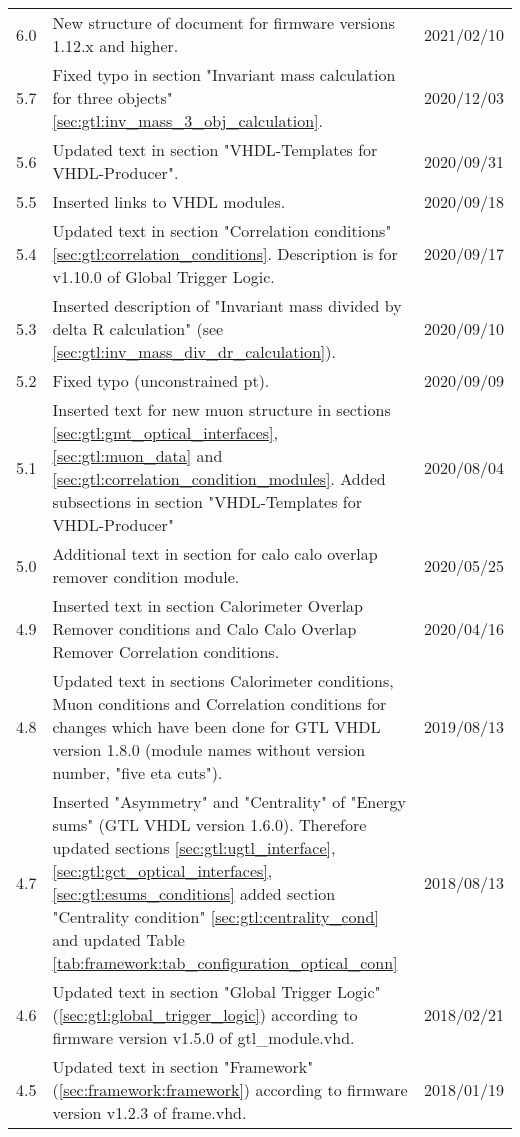 \begin{longtable}{|c|p{}|c|}
6.0 & New structure of document for firmware versions 1.12.x and higher. & 2021/02/10\\
5.7 & Fixed typo in section "Invariant mass calculation for three objects" \ref{sec:gtl:inv_mass_3_obj_calculation}. & 2020/12/03\\
5.6 & Updated text in section "VHDL-Templates for VHDL-Producer". & 2020/09/31\\
5.5 & Inserted links to VHDL modules. & 2020/09/18\\
5.4 & Updated text in section "Correlation conditions" \ref{sec:gtl:correlation_conditions}. Description is for v1.10.0 of Global Trigger Logic. & 2020/09/17\\
5.3 & Inserted description of "Invariant mass divided by delta R calculation" (see \ref{sec:gtl:inv_mass_div_dr_calculation}). & 2020/09/10\\
5.2 & Fixed typo (unconstrained pt). & 2020/09/09\\
5.1 & Inserted text for new muon structure in sections \ref{sec:gtl:gmt_optical_interfaces}, \ref{sec:gtl:muon_data} and \ref{sec:gtl:correlation_condition_modules}. Added subsections in section "VHDL-Templates for VHDL-Producer" & 2020/08/04\\
5.0 & Additional text in section for calo calo overlap remover condition module. & 2020/05/25\\
4.9 & Inserted text in section Calorimeter Overlap Remover conditions and Calo Calo Overlap Remover Correlation conditions. & 2020/04/16\\
4.8 & Updated text in sections Calorimeter conditions, Muon conditions and Correlation conditions for changes which have been done for GTL VHDL version 1.8.0 (module names without version number, "five eta cuts"). & 2019/08/13\\
4.7 & Inserted "Asymmetry" and "Centrality" of "Energy sums" (GTL VHDL version 1.6.0). Therefore updated sections \ref{sec:gtl:ugtl_interface}, \ref{sec:gtl:gct_optical_interfaces},
\ref{sec:gtl:esums_conditions} added section "Centrality condition" \ref{sec:gtl:centrality_cond} and updated Table \ref{tab:framework:tab_configuration_optical_conn} & 2018/08/13\\
4.6 & Updated text in section "Global Trigger Logic" (\ref{sec:gtl:global_trigger_logic}) according to firmware version v1.5.0 of gtl\_module.vhd. & 2018/02/21\\
4.5 & Updated text in section "Framework" (\ref{sec:framework:framework}) according to firmware version v1.2.3 of frame.vhd. & 2018/01/19\\

\end{longtable}
